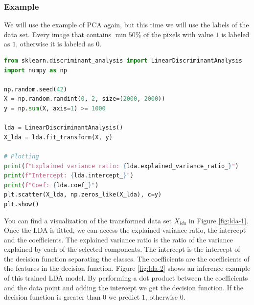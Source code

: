 \subsubsection{Example}
We will use the example of PCA again, but this time we will use the labels of the data set.
Every image that contains $\min 50\%$ of the pixels with value $1$ is labeled as $1$, otherwise it is labeled as $0$.
\begin{lstlisting}[language=Python, caption={LDA in Python}, label={code:lda}]
from sklearn.discriminant_analysis import LinearDiscriminantAnalysis
import numpy as np

np.random.seed(42)
X = np.random.randint(0, 2, size=(2000, 2000))
y = np.sum(X, axis=1) >= 1000

lda = LinearDiscriminantAnalysis()
X_lda = lda.fit_transform(X, y)

# Plotting
print(f"Explained variance ratio: {lda.explained_variance_ratio_}")
print(f"Intercept: {lda.intercept_}")
print(f"Coef: {lda.coef_}")
plt.scatter(X_lda, np.zeros_like(X_lda), c=y)
plt.show()
\end{lstlisting}
You can find a visualization of the transformed data set $X_{lda}$ in Figure \ref{fig:lda-1}.
Once the LDA is fitted, we can access the explained variance ratio, the intercept and the coefficients.
The explained variance ratio is the ratio of the variance explained by each of the selected components.
The intercept is the intercept of the decision function separating the classes.
The coefficients are the coefficients of the features in the decision function.
Figure \ref{fig:lda-2} shows an inference example of this trained LDA model.
By performing a dot product between the coefficients and the data point and adding the intercept we get the decision function.
If the decision function is greater than $0$ we predict $1$, otherwise $0$.

